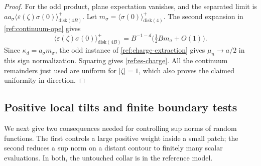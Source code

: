 \begin{proof}
For the odd product, plane expectation vanishes, and the separated limit
is $aa_\sigma\langle\varepsilon(\zeta)\sigma(0)\rangle^+
_{\mathrm{disk}(4B)}$.  Let
$m_\sigma=\langle\sigma(0)\rangle^+_{\mathrm{disk}(4)}$.  The second
expansion in \eqref{ref:continuum-ope} gives
\[
 \langle\varepsilon(\zeta)\sigma(0)\rangle^+
                  _{\mathrm{disk}(4B)}
 =B^{-1-d}\bigl(\tfrac12 Bm_\sigma+O(1)\bigr).
\]
Since $\kappa_d=a_\sigma m_\sigma$, the odd instance of
\eqref{ref:charge-extraction} gives $\mu_n\to a/2$ in this sign
normalization.  Squaring gives \eqref{ref:es-charge}.  All the continuum
remainders just used are uniform for $|\zeta|=1$, which also proves the
claimed uniformity in direction.
\end{proof}

\subsection{Positive local tilts and finite boundary tests}

We next give two consequences needed for controlling sup norms of random
functions.  The first controls a large positive weight inside a small patch;
the second reduces a sup norm on a distant contour to finitely many scalar
evaluations.  In both, the untouched collar is in the reference model.

